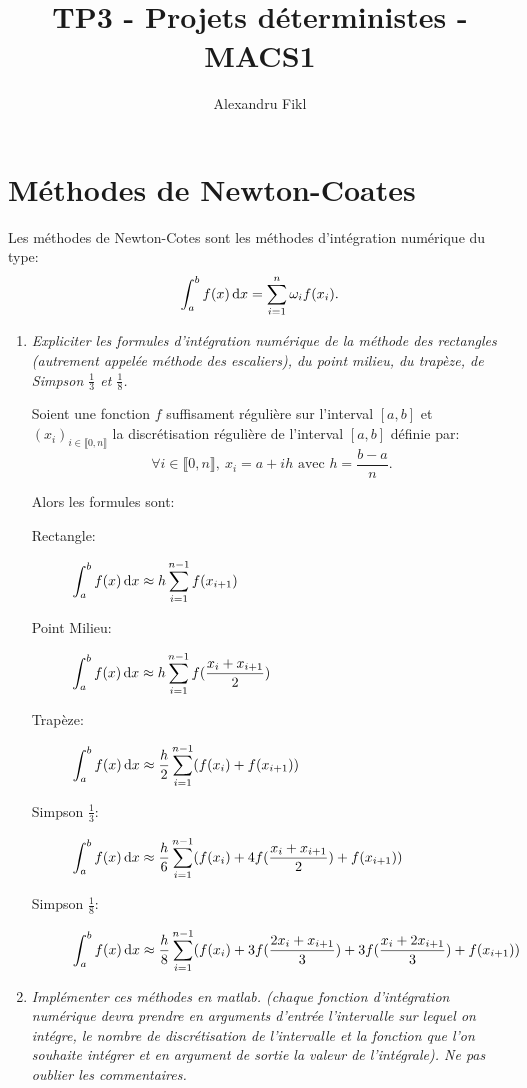 \documentclass[a4paper,10pt]{article}
\title{TP3 - Projets déterministes - MACS1}
\author{Alexandru Fikl}
\begin{document}
\maketitle

\section{Méthodes de Newton-Coates}
Les méthodes de Newton-Cotes sont les méthodes d'intégration numérique du type:
\[
\int_a^b f(x) \,\mathrm{d} x = \sum_{i = 1}^n \omega_i f(x_i).
\]

\begin{enumerate}
    \item \emph{Expliciter les formules d'intégration numérique de la méthode des
    rectangles (autrement appelée méthode des escaliers), du point milieu, du
    trapèze, de Simpson $\frac{1}{3}$ et $\frac{1}{8}$.}

    Soient une fonction $f$ suffisament régulière sur l'interval $[a, b]$ et
    $(x_i)_{i \in \llbracket 0, n \rrbracket}$ la discrétisation régulière de
    l'interval $[a, b]$ définie par:
\[
    \forall i \in \llbracket 0, n \rrbracket,~ x_i = a + ih \text{ avec }
    h = \frac{b - a}{n}.
\]

    Alors les formules sont:
    \begin{description}
        \item[Rectangle:] $\displaystyle \int_a^b f(x) \,\mathrm{d} x \approx h
        \sum_{i = 1}^{n - 1} f(x_{i + 1})$
        \item[Point Milieu:] $\displaystyle \int_a^b f(x) \,\mathrm{d} x \approx h
        \sum_{i = 1}^{n - 1} f(\frac{x_i + x_{i + 1}}{2})$
        \item[Trapèze:] $\displaystyle \int_a^b f(x) \,\mathrm{d} x \approx \frac{h}{2}
        \sum_{i = 1}^{n - 1} (f(x_i) + f(x_{i + 1}))$
        \item[Simpson $\frac{1}{3}$:] $\displaystyle \int_a^b f(x) \,\mathrm{d} x \approx
        \frac{h}{6}\sum_{i = 1}^{n - 1} (f(x_i) + 4f(\frac{x_i + x_{i + 1}}{2}) +
        f(x_{i + 1}))$
        \item[Simpson $\frac{1}{8}$:] $\displaystyle \int_a^b f(x) \,\mathrm{d} x \approx
        \frac{h}{8}\sum_{i = 1}^{n - 1} (f(x_i) + 3f(\frac{2x_i + x_{i + 1}}{3}) +
        3f(\frac{x_i + 2x_{i + 1}}{3}) + f(x_{i + 1}))$
    \end{description}

    \item \emph{Implémenter ces méthodes en matlab. (chaque fonction d'intégration
    numérique devra prendre en arguments d'entrée l'intervalle sur lequel on intégre,
    le nombre de discrétisation de l'intervalle et la fonction que l'on souhaite
    intégrer et en argument de sortie la valeur de l'intégrale). Ne pas oublier les
    commentaires.}


\end{enumerate}
\end{document}
